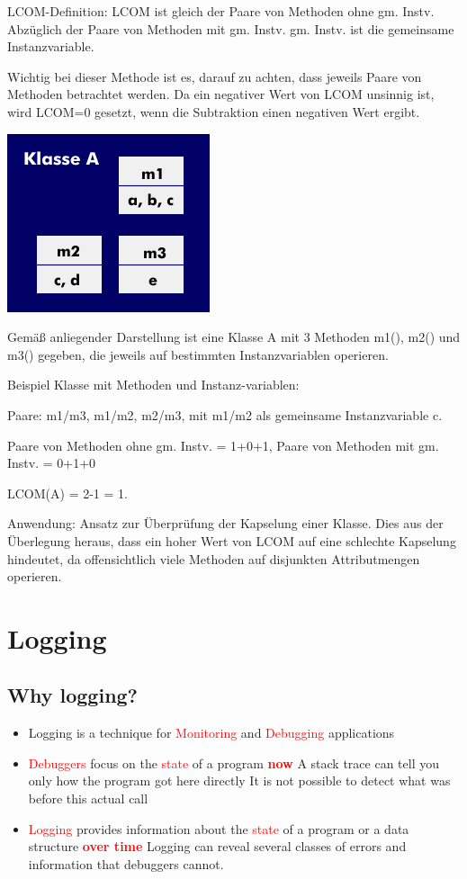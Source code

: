 \documentclass[10pt]{article}
\begin{document}
	LCOM-Definition: LCOM ist gleich der Paare von Methoden ohne gm. Instv. Abzüglich der Paare von Methoden mit gm. Instv. gm. Instv. ist die gemeinsame Instanzvariable.

	Wichtig bei dieser Methode ist es, darauf zu achten, dass jeweils Paare von Methoden betrachtet werden. Da ein negativer Wert von LCOM unsinnig ist, wird LCOM=0 gesetzt, wenn die Subtraktion einen negativen Wert ergibt.
		\begin{center}
			\includegraphics{assets/lcom_ex}
		\end{center}
	
	Gemäß anliegender Darstellung ist eine Klasse A mit 3 Methoden m1(), m2() und m3() gegeben, die jeweils auf bestimmten Instanzvariablen operieren.

	Beispiel Klasse mit Methoden und Instanz-variablen:
	
	Paare: m1/m3, m1/m2, m2/m3, mit m1/m2 als gemeinsame Instanzvariable c.

	Paare von Methoden ohne gm. Instv. = 1+0+1, Paare von Methoden mit gm. Instv. = 0+1+0

	LCOM(A) = 2-1 = 1.

	Anwendung: Ansatz zur Überprüfung der Kapselung einer Klasse. Dies aus der Überlegung heraus, dass ein hoher Wert von LCOM auf eine schlechte Kapselung hindeutet, da offensichtlich viele Methoden auf disjunkten Attributmengen operieren.
	
	\newpage
	
	\section{Logging}
	\subsection{Why logging?}
	\begin{itemize}
		\item Logging is a technique for \textcolor{red}{Monitoring} and \textcolor{red}{Debugging} applications
		\item \textcolor{red}{Debuggers} focus on the \textcolor{red}{state} of a program \textcolor{red}{\textbf{now}}
			\subitem A stack trace can tell you only how the program got here directly 
			\subitem It is not possible to detect what was before this actual call
		\item \textcolor{red}{Logging} provides information about the \textcolor{red}{state} of a program or a data structure \textcolor{red}{\textbf{over time}}
			\subitem Logging can reveal several classes of errors and information that debuggers cannot.
	\end{itemize}
	
\end{document}
